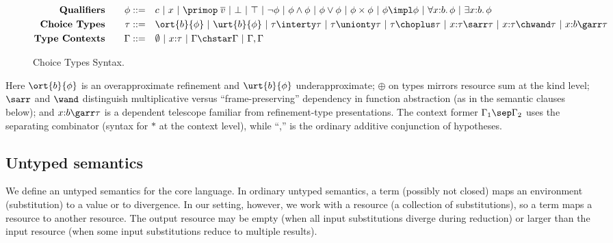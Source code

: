 \begin{figure}[h]
  {\small
    \begin{alignat*}{2}
      \text{\textbf{Qualifiers}}& \quad & \phi ::= \quad & c ~|~ x ~|~ \primop\;\overline{v} ~|~ \bot ~|~ \top  ~|~ \neg \phi ~|~ \phi \land \phi ~|~ \phi \lor \phi ~|~ \phi \times \phi ~|~ \phi \impl \phi ~|~ \forall x{:}b.\, \phi ~|~ \exists x{:}b.\, \phi
      \\ \text{\textbf{Choice Types}}& \quad & \tau ::= \quad & \ort{b}{\phi} ~|~ \urt{b}{\phi} ~|~ \tau \interty \tau ~|~ \tau \unionty \tau ~|~ \tau \choplus \tau ~|~ x{:}\tau \sarr \tau ~|~ x{:}\tau \chwand \tau ~|~ x{:}b \garr \tau
      \\ \text{\textbf{Type Contexts}}& \quad & \Gamma ::= \quad & \emptyset ~|~ x{:}\tau ~|~ \Gamma \chstar \Gamma ~|~ \Gamma, \Gamma
    \end{alignat*}}
  \caption{Choice Types Syntax. }
  \label{fig:choice-types-syntax}
  \end{figure}

Here $\ort{b}{\phi}$ is an overapproximate refinement and
$\urt{b}{\phi}$ underapproximate; $\oplus$ on types mirrors resource
sum at the kind level; $\sarr$ and $\wand$ distinguish
multiplicative versus ``frame-preserving'' dependency in function
abstraction (as in the semantic clauses below); and $x{:}b \garr \tau$
is a dependent telescope familiar from refinement-type presentations.
The context former $\Gamma_1 \sep \Gamma_2$ uses the separating
combinator (syntax for $*$ at the context level), while ``,'' is the
ordinary additive conjunction of hypotheses.

\subsection{Untyped semantics}

We define an untyped semantics for the core language. In ordinary untyped semantics, a term (possibly not closed) maps an environment (substitution) to a value or to divergence. In our setting, however, we work with a resource (a collection of substitutions), so a term maps a resource to another resource. The output resource may be empty (when all input substitutions diverge during reduction) or larger than the input resource (when some input substitutions reduce to multiple results).


